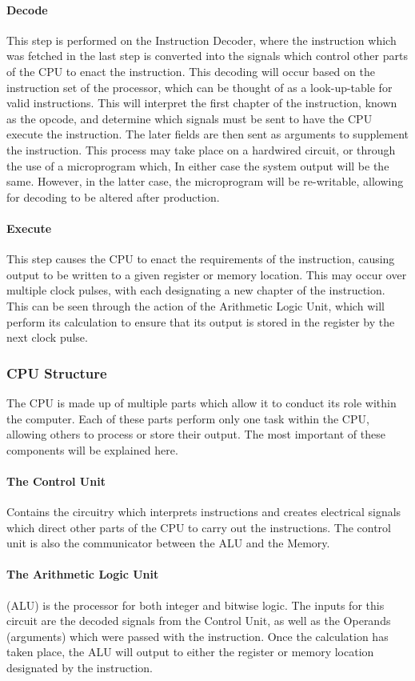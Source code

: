 				\paragraph{Decode}
					This step is performed on the Instruction Decoder, where the instruction which was fetched in the last step is converted into the signals which control other parts of the CPU to enact the instruction. 
					This decoding will occur based on the instruction set of the processor, which can be thought of as a look-up-table for valid instructions. 
					This will interpret the first chapter of the instruction, known as the opcode, and determine which signals must be sent to have the CPU execute the instruction. 
					The later fields are then sent as arguments to supplement the instruction. 
					This process may take place on a hardwired circuit, or through the use of a microprogram which, In either case the system output will be the same. 
					However, in the latter case, the microprogram will be re-writable, allowing for decoding to be altered after production. 
				\paragraph{Execute}
					This step causes the CPU to enact the requirements of the instruction, causing output to be written to a given register or memory location. 
					This may occur over multiple clock pulses, with each designating a new chapter of the instruction. 
					This can be seen through the action of the Arithmetic Logic Unit, which will perform its calculation to ensure that its output is stored in the register by the next clock pulse. 
			\subsubsection{CPU Structure}
				The CPU is made up of multiple parts which allow it to conduct its role within the computer. 
				Each of these parts perform only one task within the CPU, allowing others to process or store their output. 
				The most important of these components will be explained here. 
				\paragraph{The Control Unit}
					Contains the circuitry which interprets instructions and creates electrical signals which direct other parts of the CPU to carry out the instructions. 
					The control unit is also the communicator between the ALU and the Memory.
				\paragraph{The Arithmetic Logic Unit}
					(ALU) is the processor for both integer and bitwise logic. 
					The inputs for this circuit are the decoded signals from the Control Unit, as well as the Operands (arguments) which were passed with the instruction. 
					Once the calculation has taken place, the ALU will output to either the register or memory location designated by the instruction. 
